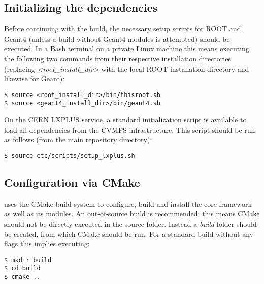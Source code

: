 \subsection{Initializing the dependencies}
\label{sec:initialize_dependencies}
Before continuing with the build, the necessary setup scripts for ROOT and Geant4 (unless a build without Geant4 modules is attempted) should be executed.
In a Bash terminal on a private Linux machine this means executing the following two commands from their respective installation directories (replacing \textit{\textless root\_install\_dir\textgreater} with the local ROOT installation directory and likewise for Geant):
\begin{verbatim}
$ source <root_install_dir>/bin/thisroot.sh
$ source <geant4_install_dir>/bin/geant4.sh
\end{verbatim}

On the CERN LXPLUS service, a standard initialization script is available to load all dependencies from the CVMFS infrastructure.
This script should be run as follows (from the main repository directory):
\begin{verbatim}
$ source etc/scripts/setup_lxplus.sh
\end{verbatim}

\subsection{Configuration via CMake}
\label{sec:cmake_config}
\apsq uses the CMake build system to configure, build and install the core framework as well as its modules.
An out-of-source build is recommended: this means CMake should not be directly executed in the source folder.
Instead a \textit{build} folder should be created, from which CMake should be run.
For a standard build without any flags this implies executing:

\begin{verbatim}
$ mkdir build
$ cd build
$ cmake ..
\end{verbatim}

